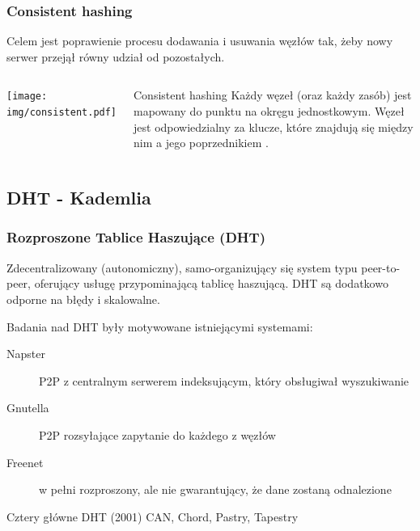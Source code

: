 \documentclass{beamer}
\begin{document}
\begin{frame}
\frametitle{Consistent hashing}

\begin{block}{}
Celem jest poprawienie procesu dodawania i usuwania węzłów tak, żeby nowy serwer przejął równy udział od pozostałych.
\end{block}

\begin{columns}[c]

\begin{center}
\texttt{[image: img/consistent.pdf]}
\end{center}

\begin{block}{Consistent hashing}
Każdy węzeł (oraz każdy zasób) jest mapowany do punktu na okręgu jednostkowym.
Węzeł jest odpowiedzialny za klucze, które znajdują się między nim a jego poprzednikiem \citep{karger1999web}. 
\end{block}

\end{columns}

\end{frame}



\subsection{DHT - Kademlia}

\begin{frame}
\frametitle{Rozproszone Tablice Haszujące (DHT)}

\begin{block}{}
Zdecentralizowany (autonomiczny), samo-organizujący się system typu peer-to-peer, oferujący usługę przypominającą tablicę haszującą.
DHT są dodatkowo odporne na błędy i skalowalne.
\end{block}

\pause
\begin{block}{}
Badania nad DHT były motywowane istniejącymi systemami:
\begin{description}
  \item[Napster] P2P z centralnym serwerem indeksującym, który obsługiwał wyszukiwanie
  \item[Gnutella] P2P rozsyłające zapytanie do każdego z węzłów
  \item[Freenet] w pełni rozproszony, ale nie gwarantujący, że dane zostaną odnalezione
\end{description}
\end{block}

\begin{block}{Cztery główne DHT (2001)}
CAN, Chord, Pastry, Tapestry
\end{block}

\end{frame}
\end{document}
